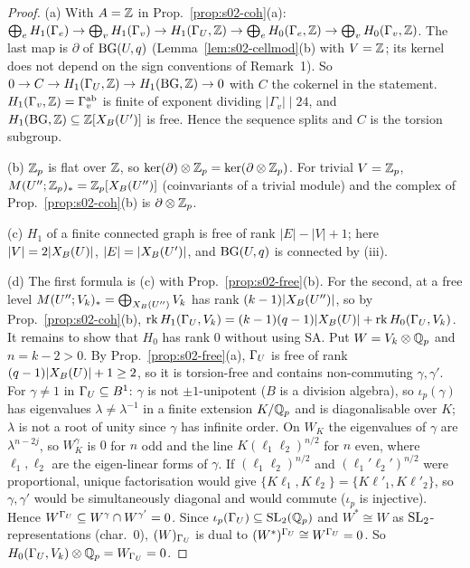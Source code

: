 \begin{proof}
(a) With $A=\mathbb{Z}$ in Prop.~\ref{prop:s02-coh}(a): $\bigoplus_eH_1(\Gamma_e)\to\bigoplus_vH_1(\Gamma_v)\to H_1(\Gamma_U,\mathbb{Z})\to\bigoplus_eH_0(\Gamma_e,\mathbb{Z})\to\bigoplus_vH_0(\Gamma_v,\mathbb{Z})$. The last map
is $\partial$ of $\mathrm{BG}(U,q)$ (Lemma~\ref{lem:s02-cellmod}(b) with $V=\mathbb{Z}$; its kernel does not depend on the sign conventions of Remark~1). So
$0\to C\to H_1(\Gamma_U,\mathbb{Z})\to H_1(\mathrm{BG},\mathbb{Z})\to0$ with $C$ the cokernel in the statement. $H_1(\Gamma_v,\mathbb{Z})=\Gamma_v^{\rm ab}$ is finite of exponent dividing $|\Gamma_v|\mid24$,
and $H_1(\mathrm{BG},\mathbb{Z})\subseteq\mathbb{Z}[X_B(U')]$ is free. Hence the sequence splits and $C$ is the torsion subgroup.

(b) $\mathbb{Z}_p$ is flat over $\mathbb{Z}$, so $\ker(\partial)\otimes\mathbb{Z}_p=\ker(\partial\otimes\mathbb{Z}_p)$. For trivial $V=\mathbb{Z}_p$, $M(U'';\mathbb{Z}_p)_*=\mathbb{Z}_p[X_B(U'')]$ (coinvariants of a trivial module) and the complex of
Prop.~\ref{prop:s02-coh}(b) is $\partial\otimes\mathbb{Z}_p$.

(c) $H_1$ of a finite connected graph is free of rank $|E|-|V|+1$; here $|V|=2|X_B(U)|$, $|E|=|X_B(U')|$, and $\mathrm{BG}(U,q)$ is connected by (iii).

(d) The first formula is (c) with Prop.~\ref{prop:s02-free}(b). For the second, at a free level $M(U'';V_k)_*=\bigoplus_{X_B(U'')}V_k$ has rank $(k-1)|X_B(U'')|$, so by
Prop.~\ref{prop:s02-coh}(b), $\operatorname{rk} H_1(\Gamma_U,V_k)=(k-1)(q-1)|X_B(U)|+\operatorname{rk} H_0(\Gamma_U,V_k)$. It remains to show that $H_0$ has rank $0$ without using SA. Put $W=V_k\otimes\mathbb{Q}_p$ and
$n=k-2>0$. By Prop.~\ref{prop:s02-free}(a), $\Gamma_U$ is free of rank $(q-1)|X_B(U)|+1\ge2$, so it is torsion-free and contains non-commuting $\gamma,\gamma'$. For $\gamma\ne1$
in $\Gamma_U\subseteq B^1$: $\gamma$ is not $\pm1$-unipotent ($B$ is a division algebra), so $\iota_p(\gamma)$ has eigenvalues $\lambda\ne\lambda^{-1}$ in a finite extension $K/\mathbb{Q}_p$ and is
diagonalisable over $K$; $\lambda$ is not a root of unity since $\gamma$ has infinite order. On $W_K$ the eigenvalues of $\gamma$ are $\lambda^{n-2j}$, so $W_K^\gamma$ is $0$ for $n$ odd
and the line $K(\ell_1\ell_2)^{n/2}$ for $n$ even, where $\ell_1,\ell_2$ are the eigen-linear forms of $\gamma$. If $(\ell_1\ell_2)^{n/2}$ and $(\ell_1'\ell_2')^{n/2}$ were proportional,
unique factorisation would give $\{K\ell_1,K\ell_2\}=\{K\ell'_1,K\ell'_2\}$, so $\gamma,\gamma'$ would be simultaneously diagonal and would commute ($\iota_p$ is injective).
Hence $W^{\Gamma_U}\subseteq W^\gamma\cap W^{\gamma'}=0$. Since $\iota_p(\Gamma_U)\subseteq\mathrm{SL}_2(\mathbb{Q}_p)$ and $W^*\cong W$ as $\mathrm{SL}_2$-representations (char.\ $0$), $(W)_{\Gamma_U}$ is dual to
$(W^*)^{\Gamma_U}\cong W^{\Gamma_U}=0$. So $H_0(\Gamma_U,V_k)\otimes\mathbb{Q}_p=W_{\Gamma_U}=0$.
\end{proof}

